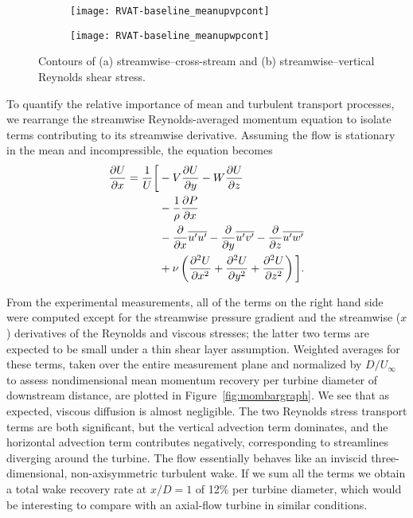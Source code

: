 \begin{figure}
    \centering

    \begin{subfigure}{\textwidth}
        \centering
        \texttt{[image: RVAT-baseline\_meanupvpcont]}
        \caption{}
        \label{fig:RVAT-baseline-uvcont}
    \end{subfigure}
    
    \begin{subfigure}{\textwidth}
        \centering
        \texttt{[image: RVAT-baseline\_meanupwpcont]}
        \caption{}
        \label{fig:RVAT-baseline-uwcont}
    \end{subfigure}
    
    \caption{Contours of (a) streamwise--cross-stream and (b)
        streamwise--vertical Reynolds shear stress.}
    
    \label{fig:Re-stress}
\end{figure}

To quantify the relative importance of mean and turbulent transport processes,
we rearrange the streamwise Reynolds-averaged momentum equation to isolate terms
contributing to its streamwise derivative. Assuming the flow is stationary in
the mean and incompressible, the equation becomes
\begin{equation}
    \begin{split}
        \frac{\partial U}{\partial x}  =  
        \frac{1}{U} \bigg{[}
        & - V\frac{\partial U}{\partial y}
        - W\frac{\partial U}{\partial z} \\
        & -\frac{1}{\rho}\frac{\partial P}{\partial x} \\
        & - \frac{\partial}{\partial x} \overline{u'u'}
        - \frac{\partial}{\partial y} \overline{u'v'}
        - \frac{\partial}{\partial z} \overline{u'w'} \\
        & + \nu\left(\frac{\partial^2 U}{\partial x^2}
        + \frac{\partial^2 U}{\partial y^2}
        + \frac{\partial^2 U}{\partial z^2} \right)
        \bigg{]}.
    \end{split}
\label{eq:momentum}
\end{equation}

From the experimental measurements, all of the terms on the right hand side were
computed except for the streamwise pressure gradient and the streamwise ($x$)
derivatives of the Reynolds and viscous stresses; the latter two terms are
expected to be small under a thin shear layer assumption. Weighted averages for
these terms, taken over the entire measurement plane and normalized by
$D/U_\infty$ to assess nondimensional mean momentum recovery per turbine
diameter of downstream distance, are plotted in Figure~\ref{fig:mombargraph}. We
see that as expected, viscous diffusion is almost negligible. The two Reynolds
stress transport terms are both significant, but the vertical advection term
dominates, and the horizontal advection term contributes negatively,
corresponding to streamlines diverging around the turbine. The flow essentially
behaves like an inviscid three-dimensional, non-axisymmetric turbulent wake. If
we sum all the terms we obtain a total wake recovery rate at $x/D=1$ of 12\% per
turbine diameter, which would be interesting to compare with an axial-flow
turbine in similar conditions.

